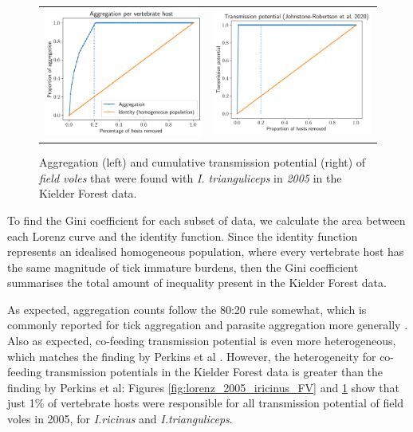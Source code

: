 \documentclass{article}
\begin{document}
\begin{figure}[]
	\begin{mdframed}[backgroundcolor=grey250,rightline=false,leftline=false,topline=false]
	\centering
	\begin{tabular}{ll}
		\includegraphics[width=.48\linewidth,valign=m]{lorenz_aggregation_FV_2005_I.Trianguliceps} & \includegraphics[width=.48\linewidth,valign=m]{lorenz_JR_FV_2005_I.Trianguliceps} \\
	\end{tabular}
	\caption{Aggregation (left) and cumulative transmission potential (right) of \textit{field voles} that were found with \textit{I. trianguliceps} in \textit{2005} in the Kielder Forest data.}
	\label{fig:lorenz_2005_itrianguliceps_FV}
	\end{mdframed}
\end{figure}

To find the Gini coefficient for each subset of data, we calculate the area between each Lorenz curve and the identity function. Since the identity function represents an idealised homogeneous population, where every vertebrate host has the same magnitude of tick immature burdens, then the Gini coefficient summarises the total amount of inequality present in the Kielder Forest data. 

As expected, aggregation counts follow the 80:20 rule somewhat, which is commonly reported for tick aggregation and parasite aggregation more generally \cite{Woolhouse1997, Ferreri2014, Brunner2008}. Also as expected, co-feeding transmission potential is even more heterogeneous, which matches the finding by Perkins et al \cite{Perkins_2003}. However, the heterogeneity for co-feeding transmission potentials in the Kielder Forest data is greater than the finding by Perkins et al: Figures \ref{fig:lorenz_2005_iricinus_FV} and \ref{fig:lorenz_2005_itrianguliceps_FV} show that just 1\% of vertebrate hosts were responsible for all transmission potential of field voles in 2005, for \textit{I.ricinus} and \textit{I.trianguliceps}.
\end{document}
